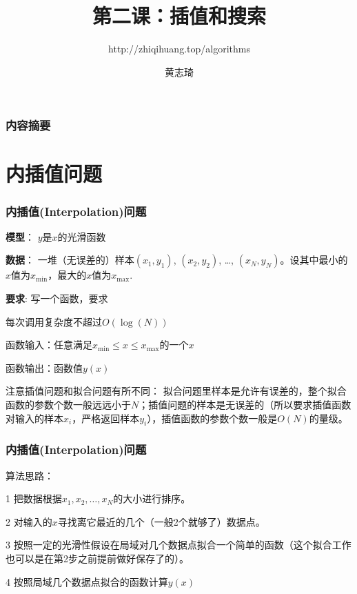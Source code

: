 \documentclass[CJK,14pt]{beamer}
\begin{document}
\bch

\title{第二课：插值和搜索}
\subtitle{http://zhiqihuang.top/algorithms}
  \author{黄志琦}
  \date{}

  \maketitle

  \begin{frame}
    \frametitle{内容摘要}
  \tableofcontents
  \end{frame}

  \section{内插值问题}

  \begin{frame}
    \frametitle{内插值(Interpolation)问题}
               {\bf 模型}： $y$是$x$的光滑函数
               
               {\bf 数据}： 一堆（无误差的）样本$(x_1,y_1)$, $(x_2, y_2)$, \ldots, $(x_N, y_N)$。设其中最小的$x$值为$x_{\min}$，最大的$x$值为$x_{\max}$.

               {\bf 要求}: 写一个函数，要求
               \bitem
               \item{每次调用复杂度不超过$O\left(\log(N)\right)$}
               
               \item{函数输入：任意满足$x_{\min}\le x\le x_{\max}$的一个$x$}
               
               \item{函数输出：函数值$y(x)$}
                 \eitem

注意插值问题和拟合问题有所不同： 拟合问题里样本是允许有误差的，整个拟合函数的参数个数一般远远小于$N$；插值问题的样本是无误差的（所以要求插值函数对输入的样本$x_i$，严格返回样本$y_i$），插值函数的参数个数一般是$O(N)$的量级。
  \end{frame}


  \begin{frame}
    \frametitle{内插值(Interpolation)问题}
    算法思路：
    \bitem
  \item[1]{把数据根据$x_1,x_2,\ldots, x_N$的大小进行排序。}
  \item[2]{对输入的$x$寻找离它最近的几个（一般2个就够了）数据点。}    
  \item[3]{按照一定的光滑性假设在局域对几个数据点拟合一个简单的函数（这个拟合工作也可以是在第2步之前提前做好保存了的）。}
  \item[4]{按照局域几个数据点拟合的函数计算$y(x)$}
    \eitem
  \end{frame}
\end{document}
